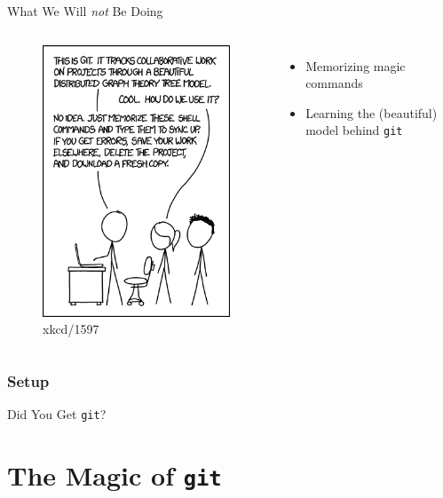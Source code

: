 \documentclass{beamer}
\theoremstyle{example}
\begin{document}
\begin{frame}{What We Will \emph{not} Be Doing}
    \begin{columns}
        \begin{figure}
            \includegraphics[scale=0.4]{img/git}
            \caption{xkcd/1597}
        \end{figure}

        \begin{itemize}
            \item Memorizing magic commands
            \item Learning the (beautiful) model behind \texttt{git}
        \end{itemize}
    \end{columns}
\end{frame}

\section{Setup}
\begin{frame}{Did You Get \texttt{git}?}
\end{frame}

\part{The Magic of \texttt{git}}
\frame{\partpage}
\frame{\tableofcontents[part=2]}
\end{document}
